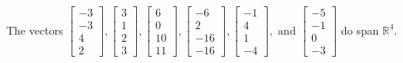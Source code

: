 \begin{exercise}
\begin{exerciseStatement}
  \end{exerciseStatement}
  \begin{exerciseAnswer}
   The vectors \(\left[\begin{array}{r}
-3 \\
-3 \\
4 \\
2
\end{array}\right] , \left[\begin{array}{r}
3 \\
1 \\
2 \\
3
\end{array}\right] , \left[\begin{array}{r}
6 \\
0 \\
10 \\
11
\end{array}\right] , \left[\begin{array}{r}
-6 \\
2 \\
-16 \\
-16
\end{array}\right] , \left[\begin{array}{r}
-1 \\
4 \\
1 \\
-4
\end{array}\right] , \text{ and } \left[\begin{array}{r}
-5 \\
-1 \\
0 \\
-3
\end{array}\right]\) 
  	 do  
	span \(\mathbb{R}^4\).
  


  \end{exerciseAnswer}
\end{exercise}